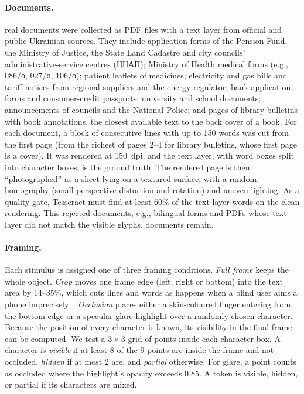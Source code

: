 \paragraph{Documents.} \NDocsCollected{} real documents were collected as PDF files with a text layer from official and public Ukrainian sources. They include application forms of the Pension Fund, the Ministry of Justice, the State Land Cadastre and city councils' administrative-service centres (ЦНАП); Ministry of Health medical forms (e.g., 086/о, 027/о, 106/о); patient leaflets of medicines; electricity and gas bills and tariff notices from regional suppliers and the energy regulator; bank application forms and consumer-credit passports; university and school documents; announcements of councils and the National Police; and pages of library bulletins with book annotations, the closest available text to the back cover of a book. For each document, a block of consecutive lines with up to 150 words was cut from the first page (from the richest of pages 2--4 for library bulletins, whose first page is a cover). It was rendered at 150~dpi, and the text layer, with word boxes split into character boxes, is the ground truth. The rendered page is then ``photographed'' as a sheet lying on a textured surface, with a random homography (small perspective distortion and rotation) and uneven lighting. As a quality gate, Tesseract must find at least 60\% of the text-layer words on the clean rendering. This rejected \NDocsRejected{} documents, e.g., bilingual forms and PDFs whose text layer did not match the visible glyphs. \NDoc{} documents remain.

\paragraph{Framing.} Each stimulus is assigned one of three framing conditions. \emph{Full frame} keeps the whole object. \emph{Crop} moves one frame edge (left, right or bottom) into the text area by 14--35\%, which cuts lines and words as happens when a blind user aims a phone imprecisely~\cite{gurari2018vizwiz}. \emph{Occlusion} places either a skin-coloured finger entering from the bottom edge or a specular glare highlight over a randomly chosen character. Because the position of every character is known, its visibility in the final frame can be computed. We test a $3\times3$ grid of points inside each character box. A character is \emph{visible} if at least 8 of the 9 points are inside the frame and not occluded, \emph{hidden} if at most 2 are, and \emph{partial} otherwise. For glare, a point counts as occluded where the highlight's opacity exceeds 0.85. A token is visible, hidden, or partial if its characters are mixed. 


